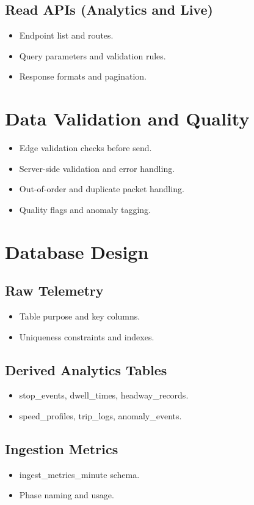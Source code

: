 \documentclass[12pt, a4paper]{article}
\begin{document}
\subsection{Read APIs (Analytics and Live)}
\begin{itemize}[leftmargin=*]
    \item Endpoint list and routes.
    \item Query parameters and validation rules.
    \item Response formats and pagination.
\end{itemize}

\section{Data Validation and Quality}
\begin{itemize}[leftmargin=*]
    \item Edge validation checks before send.
    \item Server-side validation and error handling.
    \item Out-of-order and duplicate packet handling.
    \item Quality flags and anomaly tagging.
\end{itemize}

\section{Database Design}
\subsection{Raw Telemetry}
\begin{itemize}[leftmargin=*]
    \item Table purpose and key columns.
    \item Uniqueness constraints and indexes.
\end{itemize}

\subsection{Derived Analytics Tables}
\begin{itemize}[leftmargin=*]
    \item stop\_events, dwell\_times, headway\_records.
    \item speed\_profiles, trip\_logs, anomaly\_events.
\end{itemize}

\subsection{Ingestion Metrics}
\begin{itemize}[leftmargin=*]
    \item ingest\_metrics\_minute schema.
    \item Phase naming and usage.
\end{itemize}
\end{document}
